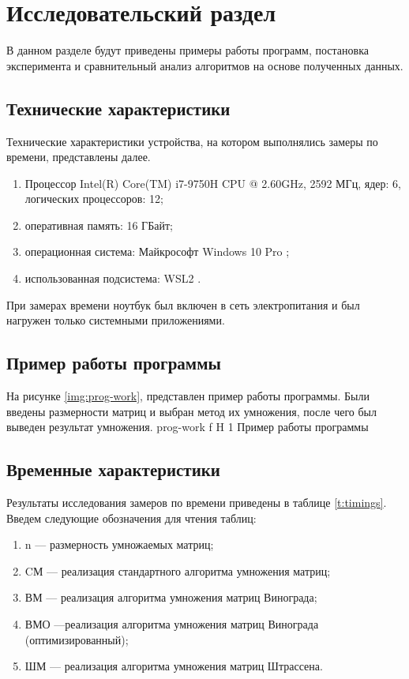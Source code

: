 \chapter{Исследовательский раздел}

В данном разделе будут приведены примеры работы программ, постановка эксперимента и сравнительный анализ алгоритмов на основе полученных данных.


\section{Технические характеристики}

Технические характеристики устройства, на котором выполнялись замеры по времени, представлены далее.

\begin{enumerate}
	\item Процессор	Intel(R) Core(TM) i7-9750H CPU @ 2.60GHz, 2592 МГц, ядер: 6, логических процессоров: 12;
	\item оперативная память: 16 ГБайт;
	\item операционная система: Майкрософт Windows 10 Pro \cite{windows};
	\item использованная подсистема: WSL2 \cite{WSL2}.
\end{enumerate}

При замерах времени ноутбук был включен в сеть электропитания и был нагружен только системными приложениями.
\section{Пример работы программы}
На рисунке \ref{img:prog-work}, представлен пример работы программы. Были введены размерности матриц и выбран метод их умножения, после чего был выведен результат умножения.
{prog-work} %
{f} %
{H} %
{1\textwidth} %
{Пример работы программы} %



\section{Временные характеристики}
Результаты исследования замеров по времени приведены в таблице \ref{t:timings}.
Введем следующие обозначения для чтения таблиц:
\begin{enumerate}
	\item n --- размерность умножаемых матриц;
	\item CМ --- реализация стандартного алгоритма умножения матриц;
	\item ВМ --- реализация алгоритма умножения матриц Винограда;
	\item ВМО ---реализация алгоритма умножения матриц Винограда (оптимизированный);
	\item ШМ --- реализация алгоритма умножения матриц Штрассена.
\end{enumerate}

